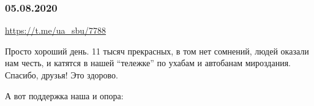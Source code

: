  
 
\subsubsection{05.08.2020}
\label{sec:tg.ch.souz_blogerov_ukrainy.05_08_2020}
\url{https://t.me/ua_sbu/7788}
  
Просто хороший день. 11 тысяч прекрасных, в том нет сомнений, людей оказали нам
честь, и катятся в нашей \enquote{тележке} по ухабам и автобанам мироздания. Спасибо,
друзья! Это здорово. 

А вот поддержка наша и опора: 

\begin{itemize}


\end{itemize}

